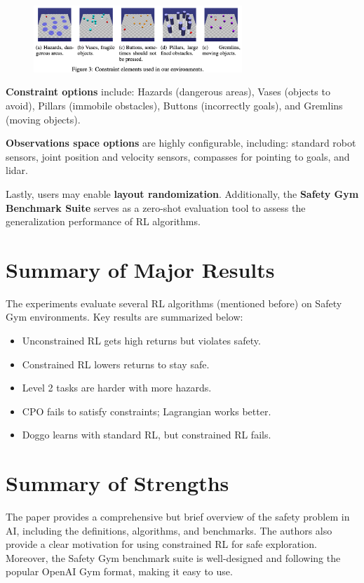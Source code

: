 \documentclass{article}
\begin{document}
\begin{figure}[h]
    \centering
    \includegraphics[width=0.7\textwidth]{./pics/tasks.png}
    \label{fig:tasks}
\end{figure}

\textbf{Constraint options} include: Hazards (dangerous areas), Vases (objects to avoid), Pillars (immobile obstacles), Buttons (incorrectly goals), and Gremlins (moving objects).

\textbf{Observations space options} are highly configurable, including: standard robot sensors, joint position and velocity sensors, compasses for pointing to goals, and lidar.

Lastly, users may enable \textbf{layout randomization}. Additionally, the \textbf{Safety Gym Benchmark Suite} serves as a zero-shot evaluation tool to assess the generalization performance of RL algorithms.

\section{Summary of Major Results}

The experiments evaluate several RL algorithms (mentioned before) on Safety Gym environments. Key results are summarized below:

\begin{itemize}
  \item Unconstrained RL gets high returns but violates safety.
  \item Constrained RL lowers returns to stay safe.
  \item Level 2 tasks are harder with more hazards.
  \item CPO fails to satisfy constraints; Lagrangian works better.
  \item Doggo learns with standard RL, but constrained RL fails.
\end{itemize}

\section{Summary of Strengths}

The paper provides a comprehensive but brief overview of the safety problem in AI, including the definitions, algorithms, and benchmarks. The authors also provide a clear motivation for using constrained RL for safe exploration. Moreover, the Safety Gym benchmark suite is well-designed and following the popular OpenAI Gym format, making it easy to use. 
\end{document}
